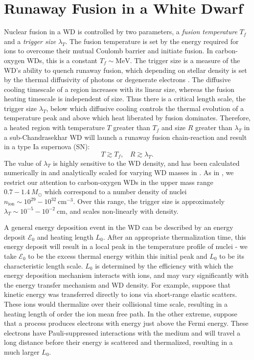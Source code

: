 \documentclass[twocolumn,showpacs,preprintnumbers,amsmath,amssymb,prd]{revtex4}
\newcommand{\MeV}{\text{MeV}}
\newcommand{\cm}{\text{cm}}
\begin{document}
\section{Runaway Fusion in a White Dwarf}
\label{sec:Review}

Nuclear fusion in a WD is controlled by two parameters, a \emph{fusion temperature} $T_f$ and a \emph{trigger size} $\lambda_T$.
 The fusion temperature is set by the energy required for ions to overcome their mutual Coulomb barrier and initiate fusion.
 In carbon-oxygen WDs, this is a constant $T_f \sim \MeV$.
 The trigger size is a measure of the WD's ability to quench runaway fusion, which depending on stellar density is set by the thermal diffusivity of photons or degenerate electrons \cite{Woosley}.
 The diffusive cooling timescale of a region increases with its linear size, whereas the fusion heating timescale is independent of size.
 Thus there is a critical length scale, the trigger size $\lambda_T$, below which diffusive cooling controls the thermal evolution of a temperature peak and above which heat liberated by fusion dominates.
Therefore, a heated region with temperature $T$ greater than $T_f$ and size $R$ greater than $\lambda_T$ in a sub-Chandrasekhar WD will launch a runaway fusion chain-reaction and result in a type Ia supernova (SN):
\begin{equation}
\label{eq:runaway}
  T \gtrsim T_f, ~~~~ R \gtrsim \lambda_T.
\end{equation}
The value of $\lambda_T$ is highly sensitive to the WD density, and has been calculated numerically in \cite{Woosley} and analytically scaled for varying WD masses in \cite{Graham:2015apa}.
As in \cite{Graham:2015apa}, we restrict our attention to carbon-oxygen WDs in the upper mass range ~$0.7 - 1.4 ~M_{\odot}$ which correspond to a number density of nuclei $n_\text{ion} \sim 10^{29} - 10^{32} ~\cm^{-3}$.
Over this range, the trigger size is approximately $\lambda_T \sim 10^{-5} - 10^{-2} ~\text{cm}$, and scales non-linearly with density.

A general energy deposition event in the WD can be described by an energy deposit $\mathcal{E}_0$ and heating length $L_0$.
 After an appropriate thermalization time, this energy deposit will result in a local peak in the temperature profile of nuclei - we take $\mathcal{E}_0$ to be the excess thermal energy within this initial peak and $L_0$ to be its characteristic length scale.
 $L_0$ is determined by the efficiency with which the energy deposition mechanism interacts with ions, and may vary significantly with the energy transfer mechanism and WD density.
 For example, suppose that kinetic energy was transferred directly to ions via short-range elastic scatters.
These ions would thermalize over their collisional time scale, resulting in a heating length of order the ion mean free path.
In the other extreme, suppose that a process produces electrons with energy just above the Fermi energy.
 These electrons have Pauli-suppressed interactions with the medium and will travel a long distance before their energy is scattered and thermalized, resulting in a much larger $L_0$.
\end{document}
